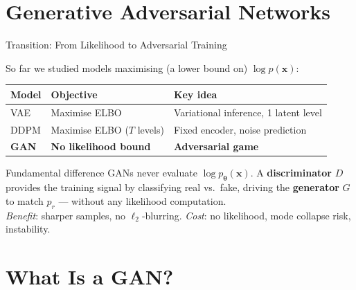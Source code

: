 \documentclass[aspectratio=169,11pt]{beamer}
\newcommand{\bx}{\bm{x}}
\newcommand{\btheta}{\bm{\theta}}
\begin{document}
\section{Generative Adversarial Networks}

\begin{frame}{Transition: From Likelihood to Adversarial Training}

So far we studied models maximising (a lower bound on) $\log p(\bx)$:

\smallskip
\begin{center}
\renewcommand{\arraystretch}{1.2}
\begin{tabular}{lll}
\toprule
\textbf{Model} & \textbf{Objective} & \textbf{Key idea}\\
\midrule
VAE  & Maximise ELBO          & Variational inference, 1 latent level\\
DDPM & Maximise ELBO ($T$ levels) & Fixed encoder, noise prediction\\
\textbf{GAN}  & \textbf{No likelihood bound} & \textbf{Adversarial game}\\
\bottomrule
\end{tabular}
\end{center}

\smallskip
\begin{alertblock}{Fundamental difference}
GANs never evaluate $\log p_{\btheta}(\bx)$.
A \textbf{discriminator} $D$ provides the training signal by classifying
real vs.\ fake, driving the \textbf{generator} $G$ to match $p_r$ —
without any likelihood computation.\\[2pt]
\textit{Benefit}: sharper samples, no $\ell_2$-blurring.
\quad\textit{Cost}: no likelihood, mode collapse risk, instability.
\end{alertblock}
\end{frame}

\section{What Is a GAN?}
\end{document}
